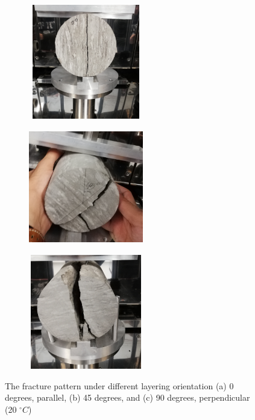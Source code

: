 \begin{figure}[ht!]
\centering
\begin{subfigure}[c]{0.48\textwidth}
\centering
\includegraphics[width=5cm,height=5cm]{figures/Amir_Splitting_Clay_0.png}
\subcaption{}
\label{fig:Amir_Splitting_Clay_0}
\end{subfigure}
\hfill
\begin{subfigure}[c]{0.48\textwidth}
\centering
\includegraphics[width=5cm,height=5cm]{figures/Amir_Splitting_Clay_45.png}
\subcaption{}
\label{fig:Amir_Splitting_Clay_45}
\end{subfigure}
\hfill
\begin{subfigure}[c]{0.48\textwidth}
\centering
\includegraphics[width=5cm,height=5cm]{figures/Amir_Splitting_Clay_90.png}
\subcaption{}
\label{fig:Amir_Splitting_Clay_90}
\end{subfigure}
\caption{The fracture pattern under different layering orientation (a) 0 degrees, parallel, (b) 45 degrees, and (c) 90 degrees, perpendicular (20 $^{\circ}C$)}
\end{figure}

